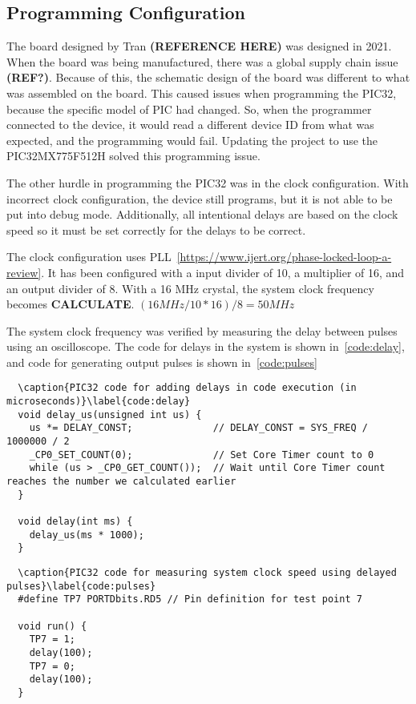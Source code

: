 \subsection{Programming Configuration}
The board designed by Tran \textbf{(REFERENCE HERE)} was designed in 2021.
When the board was being manufactured, there was a global supply chain issue \textbf{(REF?)}.
Because of this, the schematic design of the board was different to what was assembled on the board.
This caused issues when programming the PIC32, because the specific model of PIC had changed.
So, when the programmer connected to the device, it would read a different device ID from what was expected,
and the programming would fail.
Updating the project to use the PIC32MX775F512H solved this programming issue.

The other hurdle in programming the PIC32 was in the clock configuration.
With incorrect clock configuration, the device still programs, but it is not able to be put into debug mode.
Additionally, all intentional delays are based on the clock speed so it must be set correctly for the delays to be correct.

The clock configuration uses PLL~\ref{https://www.ijert.org/phase-locked-loop-a-review}.
It has been configured with a input divider of 10, a multiplier of 16, and an output divider of 8.
With a 16 MHz crystal, the system clock frequency becomes \textbf{CALCULATE}.
\((16 MHz / 10 * 16) / 8 = 50 MHz\)

The system clock frequency was verified by measuring the delay between pulses using an oscilloscope.
The code for delays in the system is shown in~\ref{code:delay}, and code for generating output pulses is shown in~\ref{code:pulses}

\begin{lstlisting}
  \caption{PIC32 code for adding delays in code execution (in microseconds)}\label{code:delay}
  void delay_us(unsigned int us) {
    us *= DELAY_CONST;              // DELAY_CONST = SYS_FREQ / 1000000 / 2
    _CP0_SET_COUNT(0);              // Set Core Timer count to 0
    while (us > _CP0_GET_COUNT());  // Wait until Core Timer count reaches the number we calculated earlier
  }

  void delay(int ms) {
    delay_us(ms * 1000);
  }
\end{lstlisting}

\begin{lstlisting}
  \caption{PIC32 code for measuring system clock speed using delayed pulses}\label{code:pulses}
  #define TP7 PORTDbits.RD5 // Pin definition for test point 7

  void run() {
    TP7 = 1;
    delay(100);
    TP7 = 0;
    delay(100);
  }
\end{lstlisting}

